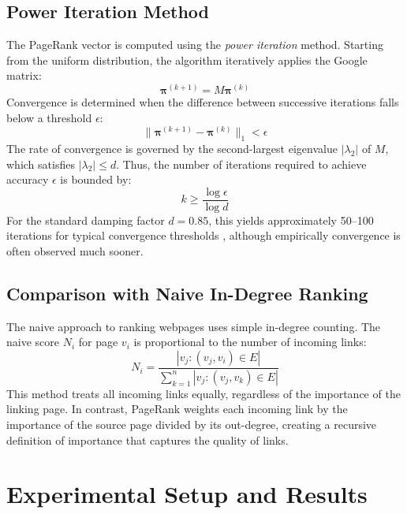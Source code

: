\documentclass[conference]{IEEEtran}
\begin{document}
\subsection{Power Iteration Method}
The PageRank vector is computed using the \textit{power iteration} method. Starting from the uniform distribution, the algorithm iteratively applies the Google matrix:
\begin{equation}
\boldsymbol{\pi}^{(k+1)} = M \boldsymbol{\pi}^{(k)}
\end{equation}
Convergence is determined when the difference between successive iterations falls below a threshold $\epsilon$:
\begin{equation}
\| \boldsymbol{\pi}^{(k+1)} - \boldsymbol{\pi}^{(k)} \|_1 < \epsilon
\end{equation}
The rate of convergence is governed by the second-largest eigenvalue $|\lambda_2|$ of $M$, which satisfies $|\lambda_2| \leq d$. Thus, the number of iterations required to achieve accuracy $\epsilon$ is bounded by:
\begin{equation}
k \geq \frac{\log \epsilon}{\log d}
\end{equation}
For the standard damping factor $d = 0.85$, this yields approximately 50--100 iterations for typical convergence thresholds \cite{b4}, although empirically convergence is often observed much sooner.

\subsection{Comparison with Naive In-Degree Ranking}
The naive approach to ranking webpages uses simple in-degree counting. The naive score $N_i$ for page $v_i$ is proportional to the number of incoming links:
\begin{equation}
N_i = \frac{|{v_j : (v_j, v_i) \in E}|}{\sum_{k=1}^{n} |{v_j : (v_j, v_k) \in E}|}
\end{equation}
This method treats all incoming links equally, regardless of the importance of the linking page. In contrast, PageRank weights each incoming link by the importance of the source page divided by its out-degree, creating a recursive definition of importance that captures the quality of links.

\section{Experimental Setup and Results}
\end{document}
